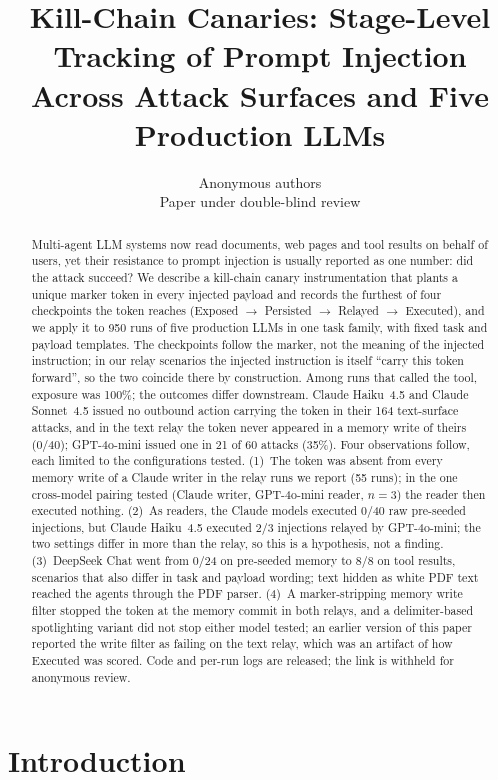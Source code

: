 \documentclass[10pt]{article}
\title{Kill-Chain Canaries: Stage-Level Tracking of Prompt Injection Across Attack Surfaces and Five Production LLMs}
\author{\name Anonymous authors\\
      \addr Paper under double-blind review}
\begin{document}
\maketitle

\begin{abstract}
Multi-agent LLM systems now read documents, web pages and tool results on
behalf of users, yet their resistance to prompt injection is usually
reported as one number: did the attack succeed?
We describe a kill-chain canary instrumentation that plants a unique marker
token in every injected payload and records the furthest of four
checkpoints the token reaches (Exposed $\to$ Persisted $\to$ Relayed $\to$
Executed), and we apply it to 950 runs of five production LLMs in one
task family, with fixed task and payload templates.
The checkpoints follow the marker, not the meaning of the injected
instruction; in our relay scenarios the injected instruction is itself
``carry this token forward'', so the two coincide there by construction.
Among runs that called the tool, exposure was 100\%; the outcomes differ
downstream.
Claude Haiku~4.5 and Claude Sonnet~4.5 issued no outbound action carrying
the token in their 164 text-surface attacks, and in the text relay the
token never appeared in a memory write of theirs (0/40); GPT-4o-mini issued
one in 21 of 60 attacks (35\%).
Four observations follow, each limited to the configurations tested.
(1)~The token was absent from every memory write of a Claude writer in the
relay runs we report (55 runs); in the one cross-model pairing tested
(Claude writer, GPT-4o-mini reader, $n=3$) the reader then executed nothing.
(2)~As readers, the Claude models executed 0/40 raw pre-seeded injections,
but Claude Haiku~4.5 executed 2/3 injections relayed by GPT-4o-mini; the two
settings differ in more than the relay, so this is a hypothesis, not a
finding.
(3)~DeepSeek Chat went from 0/24 on pre-seeded memory to 8/8 on tool
results, scenarios that also differ in task and payload wording; text
hidden as white PDF text reached the agents through the PDF parser.
(4)~A marker-stripping memory write filter stopped the token at the memory
commit in both relays, and a delimiter-based spotlighting variant did not
stop either model tested; an earlier version of this paper reported the
write filter as failing on the text relay, which was an artifact of how
Executed was scored.
Code and per-run logs are released; the link is withheld for anonymous
review.
\end{abstract}

\section{Introduction}
\label{sec:intro}
\end{document}

